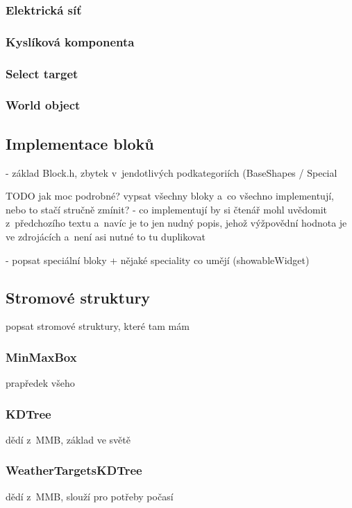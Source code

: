 \subsubsection{Elektrická síť}


\subsubsection{Kyslíková komponenta}


\subsubsection{Select target}


\subsubsection{World object}






\subsection{Implementace bloků}
 - základ Block.h, zbytek v~jendotlivých podkategoriích (BaseShapes / Special
 
 TODO jak moc podrobné? vypsat všechny bloky a~co všechno implementují, nebo to stačí stručně zmínit? - co implementují by si čtenář mohl uvědomit z~předchozího textu a~navíc je to jen nudný popis, jehož výžpovědní hodnota je ve zdrojácích a~není asi nutné to tu duplikovat

- popsat speciální bloky + nějaké speciality co umějí (showableWidget)


\subsection{Stromové struktury}
popsat stromové struktury, které tam mám


\subsubsection{MinMaxBox}

prapředek všeho



\subsubsection{KDTree}

dědí z~MMB, základ ve světě


\subsubsection{WeatherTargetsKDTree}

dědí z~MMB, slouží pro potřeby počasí